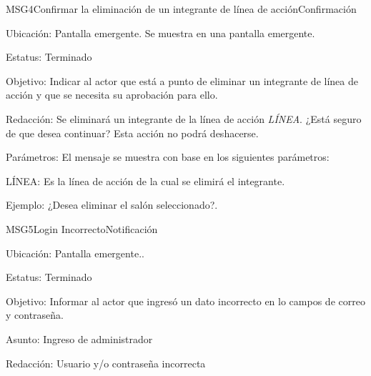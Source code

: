 \begin{mensaje}{MSG4}{Confirmar la eliminación de un integrante de línea de acción}{Confirmación}
    \item[Ubicación:] Pantalla emergente. Se muestra en una pantalla emergente.
    \item[Estatus:] Terminado
    \item[Objetivo:] Indicar al actor que está a punto de eliminar un integrante de línea de acción y que se necesita su aprobación para ello.
    \item[Redacción:] Se eliminará un integrante de la línea de acción \textit{LÍNEA}. ¿Está seguro de que desea continuar? Esta acción no podrá deshacerse.
    \item[Parámetros:] El mensaje se muestra con base en los siguientes parámetros:
    \begin{Citemize}
	\item LÍNEA: Es la línea de acción de la cual se elimirá el integrante.
    \end{Citemize}
    \item[Ejemplo:] ¿Desea eliminar el salón seleccionado?.
\end{mensaje}

\begin{mensaje}{MSG5}{Login Incorrecto}{Notificación}
	\item[Ubicación:] Pantalla emergente..
	\item[Estatus:] Terminado
	\item[Objetivo:] Informar al actor que ingresó un dato incorrecto en lo campos de correo y contraseña.
	\item[Asunto:] Ingreso de administrador
	\item[Redacción:] Usuario y/o contraseña incorrecta
\end{mensaje}

